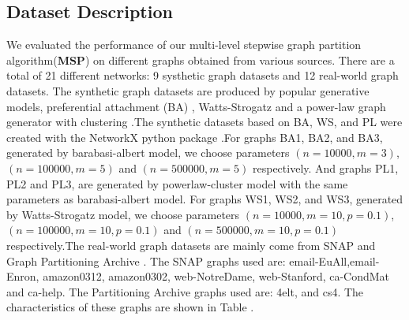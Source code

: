\documentclass{acm_proc_article-sp}
\begin{document}
\subsection{Dataset Description}
We evaluated the performance of our multi-level stepwise graph partition algorithm(\textbf{MSP}) on  different graphs obtained from various sources. There are a total of 21 different networks: 9 systhetic graph datasets and 12 real-world graph datasets. The synthetic graph datasets are produced by popular generative models, preferential attachment (BA) \cite{barabasi:emergence}, Watts-Strogatz \cite{small-world-watts-strogatz} and a power-law graph generator with clustering \cite{Holme2002}.The synthetic datasets based on BA, WS, and PL were created with the NetworkX python package \cite{url:networkx}.For graphs BA1, BA2, and BA3, generated by barabasi-albert model, we choose parameters $(n=10000, m=3)$, $(n=100000, m=5)$ and $(n=500000, m=5)$ respectively. And graphs PL1, PL2 and PL3, are generated by powerlaw-cluster model with the same parameters as barabasi-albert model. For graphs WS1, WS2, and WS3, generated by Watts-Strogatz model, we choose parameters $(n=10000, m=10, p=0.1)$, $(n=100000, m=10, p=0.1)$ and $(n=500000, m=10, p=0.1)$ respectively.The real-world graph datasets  are mainly come from SNAP\cite{url:snap} and Graph Partitioning Archive \cite{url:gpa}. The SNAP graphs used are: email-EuAll,email-Enron, amazon0312, amazon0302, web-NotreDame, web-Stanford, ca-CondMat and ca-help. The Partitioning Archive graphs used are:  4elt, and cs4. The characteristics of these graphs are shown in Table .
\end{document}
